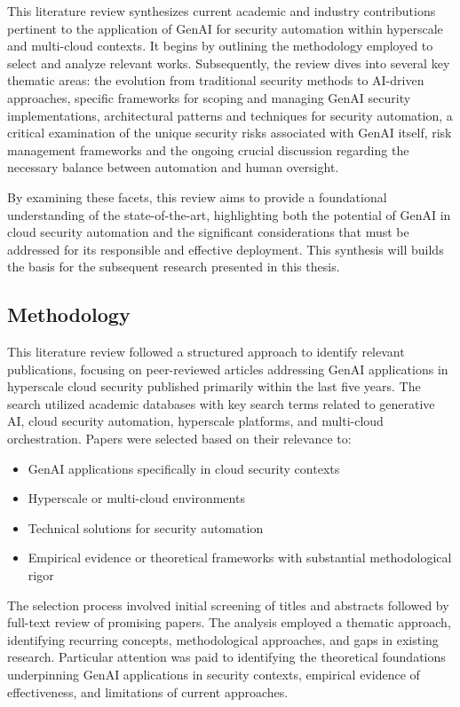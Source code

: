 This literature review synthesizes current academic and industry contributions pertinent to the application of GenAI for security automation within hyperscale and multi-cloud contexts. It begins by outlining the methodology employed to select and analyze relevant works. Subsequently, the review dives into several key thematic areas: the evolution from traditional security methods to AI-driven approaches, specific frameworks for scoping and managing GenAI security implementations, architectural patterns and techniques for security automation, a critical examination of the unique security risks associated with GenAI itself, risk management frameworks and the ongoing crucial discussion regarding the necessary balance between automation and human oversight.

By examining these facets, this review aims to provide a foundational understanding of the state-of-the-art, highlighting both the potential of GenAI in cloud security automation and the significant considerations that must be addressed for its responsible and effective deployment. This synthesis will builds the basis for the subsequent research presented in this thesis.

\subsection{Methodology} %
\label{sec:Methodology}

This literature review followed a structured approach to identify relevant publications, focusing on peer-reviewed articles addressing GenAI applications in hyperscale cloud security published primarily within the last five years. The search utilized academic databases with key search terms related to generative AI, cloud security automation, hyperscale platforms, and multi-cloud orchestration.
Papers were selected based on their relevance to:

\begin{itemize}
\item GenAI applications specifically in cloud security contexts
\item Hyperscale or multi-cloud environments
\item Technical solutions for security automation
\item Empirical evidence or theoretical frameworks with substantial methodological rigor
\end{itemize}

The selection process involved initial screening of titles and abstracts followed by full-text review of promising papers. The analysis employed a thematic approach, identifying recurring concepts, methodological approaches, and gaps in existing research. Particular attention was paid to identifying the theoretical foundations underpinning GenAI applications in security contexts, empirical evidence of effectiveness, and limitations of current approaches.

